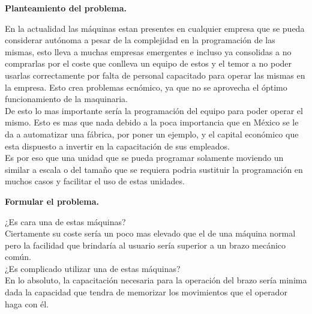 \documentclass[letterpaper]{article}
\begin{document}
\begin{large}
    \begin{LARGE}
        \textbf{Planteamiento del problema.}\\
    \end{LARGE}%
    \begin{large}
    En la actualidad las máquinas estan presentes en cualquier empresa que se pueda considerar autónoma a pesar de la complejidad en la programación de las mismas, esto lleva a muchas empresas emergentes e incluso ya consolidas a no comprarlas por el coste que conlleva un equipo de estos y el temor a no poder usarlas correctamente por falta de personal capacitado para operar las mismas en la empresa. Esto crea problemas ecnómico, ya que no se aprovecha el óptimo funcionamiento de la maquinaria.\\
    De esto lo mas importante sería la programación del equipo para poder operar el mismo. Esto es mas que nada debido a la poca importancia que en México se le da a automatizar una fábrica, por poner un ejemplo, y el capital económico que esta dispuesto a invertir en la capacitación de sus empleados.\\
    Es por eso que una unidad que se pueda programar solamente moviendo un similar a escala o del tamaño que se requiera podria sustituir la programación en muchos casos y facilitar el uso de estas unidades.\\
    \end{large}
\end{large}

\begin{large}
    \begin{LARGE}
       \textbf{Formular el problema.}\\
    \end{LARGE}
    
    ¿Es cara una de estas máquinas?\\
    Ciertamente su coste sería un poco mas elevado que el de una máquina normal pero la facilidad que brindaría al usuario sería superior a un brazo mecánico común.\\

    ¿Es complicado utilizar una de estas máquinas?\\
    En lo absoluto, la capacitación necesaria para la operación del brazo sería minima dada la capacidad que tendra de memorizar los movimientos que el operador haga con él.\\
    
    
\end{large}
\end{document}
